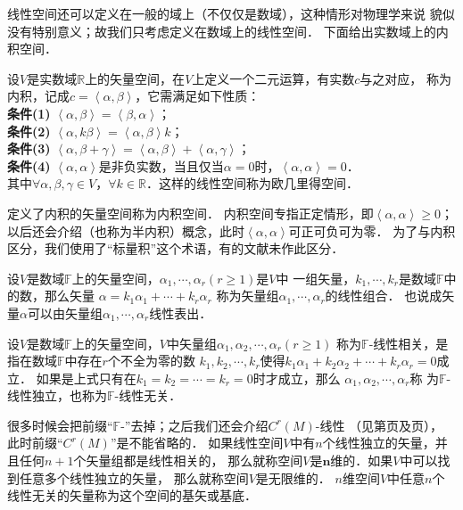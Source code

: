 线性空间还可以定义在一般的域上（不仅仅是数域），这种情形对物理学来说
貌似没有特别意义；故我们只考虑定义在数域上的线性空间．
下面给出实数域上的内积空间．

\begin{definition} \label{chmla:def_Euclidean-space}
    设$V$是实数域$\mathbb{R}$上的矢量空间，在$V$上定义一个二元运算，有实数$c$与之对应，
    称为{\heiti 内积}，记成$c=\left<\alpha,\beta\right>$，它需满足如下性质：\\
    {\heiti\bfseries 条件(1)} \quad $\left<\alpha,\beta\right>=\left<\beta,\alpha\right>$；\\
    {\heiti\bfseries 条件(2)} \quad $\left<\alpha,k\beta\right>=\left<\alpha,\beta\right>k$；\\
    {\heiti\bfseries 条件(3)} \quad $\left<\alpha,\beta+\gamma\right>=\left<\alpha,\beta\right>+\left<\alpha,\gamma\right>$； \\
    {\heiti\bfseries 条件(4)} \quad $\left<\alpha,\alpha\right>$是非负实数，当且仅当$\alpha=0$时，$\left<\alpha,\alpha\right> = 0$．\\
    其中$\forall\alpha,\beta,\gamma \in V$，$\forall k\in \mathbb{R}$．这样的线性空间称为{\heiti 欧几里得空间}．
\end{definition}


定义了内积的矢量空间称为{\heiti 内积空间}．
内积空间专指正定情形，即$\left<\alpha,\alpha\right>\geqslant 0$；
以后还会介绍（也称为半内积）概念，此时$\left<\alpha,\alpha\right>$可正可负可为零．
为了与内积区分，我们使用了“标量积”这个术语，有的文献未作此区分．





设$V$是数域$\mathbb{F}$上的矢量空间，$\alpha_1,\cdots,\alpha_r(r\geqslant1)$是$V$中
一组矢量，$k_1,\cdots,k_r$是数域$\mathbb{F}$中的数，那么矢量
$\alpha = k_1\alpha_1+\cdots+k_r\alpha_r$
称为矢量组$\alpha_1,\cdots,\alpha_r$的线性组合．
也说成矢量$\alpha$可以由矢量组$\alpha_1,\cdots,\alpha_r$线性表出．

\begin{definition}\label{chmla:def_linear-dependence_base}
    设$V$是数域$\mathbb{F}$上的矢量空间，$V$中矢量组$\alpha_1,\alpha_2,\cdots,\alpha_r(r\geqslant1)$
    称为$\mathbb{F}$-{\heiti 线性相关}，是指在数域$\mathbb{F}$中存在$r$个不全为零的数
    $k_1,k_2,\cdots,k_r$使得$k_1\alpha_1+k_2\alpha_2+\cdots+k_r\alpha_r=0$成立．
    如果是上式只有在$k_1=k_2=\cdots=k_r=0$时才成立，那么
    $\alpha_1,\alpha_2,\cdots,\alpha_r$称
    为$\mathbb{F}$-{\heiti 线性独立}，也称为$\mathbb{F}$-{\heiti 线性无关}．
\end{definition}
很多时候会把前缀“$\mathbb{F}$-”去掉；之后我们还会介绍$C^r(M)$-线性
（见第\pageref{chdm:eqn_functimesv}页及\pageref{chdm:thm_Tensor-Characterization-Lemma}页），
此时前缀“$C^r(M)$”是不能省略的．
如果线性空间$V$中有$n$个线性独立的矢量，并且任何$n+1$个矢量组都是线性相关的，
那么就称空间$V$是$\boldsymbol{n}${\heiti 维}的．如果$V$中可以找到任意多个线性独立的矢量，
那么就称空间$V$是{\heiti 无限维}的．
$n$维空间$V$中任意$n$个线性无关的矢量称为这个空间的{\heiti 基矢}或{\heiti 基底}．


